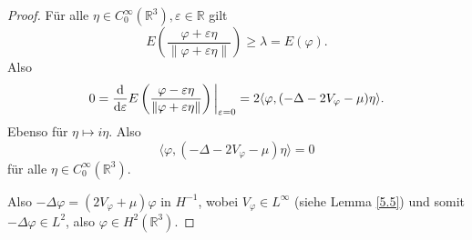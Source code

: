 \documentclass[
paper=a4,
bibtotocnumbered,
liststotocnumbered,
tablecaptionabove,
pointlessnumbers,
twoside,
openright,
10pt
]
{report}
\let\Re\relax\let\Im\relax
\DeclareMathOperator{\Re}{Re}
\DeclareMathOperator{\Im}{Im}
\let\phi\varphi
\theoremstyle{definition}
\numberwithin{equation}{chapter}
\begin{document}
\begin{proof}
Für alle $\eta \in C_0^\infty(\mathbb R^3), \varepsilon \in \mathbb R$ gilt
\begin{equation}
E\left (\frac{\phi + \varepsilon \eta}{\| \phi + \varepsilon \eta\|} \right ) \ge \lambda = E(\phi).
\end{equation}
Also 
\begin{equation}
0 = \frac{\mathrm d}{\mathrm d\varepsilon} E\left (\frac{\phi - \varepsilon \eta}{\| \phi + \varepsilon \eta\|} \right )\bigg |_{\varepsilon=0} = 2\Re \langle \phi, (- \Delta - 2V_\phi- \mu) \eta\rangle.
\end{equation}
Ebenso für $\eta \mapsto i \eta$. Also
\begin{equation}
\langle \phi, (-\Delta - 2V_\phi- \mu) \eta\rangle =0
\end{equation}
für alle $\eta \in C_0^\infty(\mathbb R^3)$.

Also $-\Delta \phi = (2V_\phi + \mu) \phi$ in $H^{-1}$, wobei $V_\phi \in L^\infty$ (siehe Lemma \eqref{5.5}) und somit $-\Delta \phi \in L^2$, also $\phi \in H^2(\mathbb R^3)$.
\end{proof}
\end{document}

